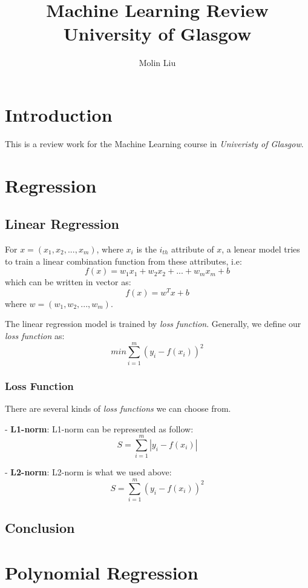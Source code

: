 \documentclass[12pt]{article}
\title{
    Machine Learning Review\\
    \large University of Glasgow
}
\author{Molin Liu}
\begin{document}
\maketitle

\section*{Introduction}

This is a review work for the Machine Learning course in
\textit{Univeristy of Glasgow}.

\section{Regression}
\subsection{Linear Regression}

For $x = (x_1, x_2, ..., x_m)$, 
where $x_i$ is the $i_{th}$ attribute of $x$, 
a lenear model tries to train a linear combination function
from these attributes, i.e:
$$f(x) = w_1 x_1 + w_2 x_2 +...+ w_m x_m+b$$
which can be written in vector as:
$$f(x)=w^Tx+b$$
where $w=(w_1, w_2,...,w_m)$.

The linear regression model is trained by \textit{loss function}.
Generally, we define our \textit{loss function} as:
$$min\sum_{i=1}^{m}{(y_i-f(x_i))^2}$$

\subsubsection{Loss Function}

There are several kinds of \textit{loss functions} we can choose from.

- \textbf{L1-norm}: L1-norm can be represented as follow:
$$S=\sum_{i=1}^{m}\left|y_{i}-f\left(x_{i}\right)\right|$$

- \textbf{L2-norm}: L2-norm is what we used above:
$$S=\sum_{i=1}^{m}\left(y_{i}-f\left(x_{i}\right)\right)^{2}$$

\subsection{Conclusion}

\section{Polynomial Regression}
\end{document}
